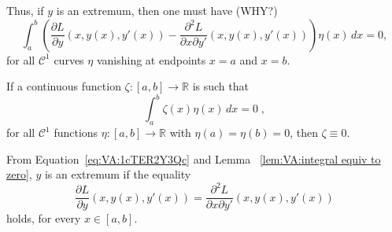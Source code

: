 Thus, if $y$ is an extremum, then one must have (WHY?)
\begin{equation}\label{eq:VA:1cTER2Y3Qc}
	\int_a^b\left(\dfrac{\partial L}{\partial y}(x,
	y(x),y'(x))-\dfrac{\partial^2 L}{\partial x\partial y'}(x,
	y(x),y'(x))\right)\eta(x)\,dx=0,
\end{equation}
for all $\mathcal{C}^1$ curves $\eta$ vanishing at endpoints $x=a$ and 
$x=b$.

\begin{lemma}\label{lem:VA:integral equiv to zero}
	If a continuous function $\zeta:[a,b]\to\mathbb{R}$ is such that
	\[\int_a^b \zeta(x)\eta(x)\,dx=0\;,\]
	for all $\mathcal{C}^1$ functions $\eta:[a,b]\to\mathbb{R}$ with 
	$\eta(a)=\eta(b)=0$, then $\zeta\equiv0$.
\end{lemma}

From Equation~\eqref{eq:VA:1cTER2Y3Qc} and Lemma~
\eqref{lem:VA:integral equiv to zero}, $y$ is an extremum if the equality
\begin{equation}
	\dfrac{\partial L}{\partial y}(x,
	y(x),y'(x))=\dfrac{\partial^2 L}{\partial x\partial y'}(x,
	y(x),y'(x))
\end{equation}
holds, for every $x\in[a,b]$.